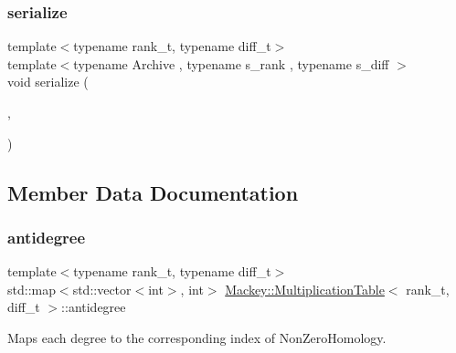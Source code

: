\subsubsection{\texorpdfstring{serialize}{serialize}}
{\footnotesize\ttfamily template$<$typename rank\+\_\+t, typename diff\+\_\+t$>$ \\
template$<$typename Archive , typename s\+\_\+rank , typename s\+\_\+diff $>$ \\
void serialize (\begin{DoxyParamCaption}\item[{Archive \&}]{,  }\item[{\hyperlink{classMackey_1_1MultiplicationTable}{Multiplication\+Table}$<$ s\+\_\+rank, s\+\_\+diff $>$ \&}]{ }\end{DoxyParamCaption})\hspace{0.3cm}{\ttfamily [friend]}}



\subsection{Member Data Documentation}
\mbox{\label{classMackey_1_1MultiplicationTable_ac5749155e5531a3c728d8227caed63eb}} 
\subsubsection{\texorpdfstring{antidegree}{antidegree}}
{\footnotesize\ttfamily template$<$typename rank\+\_\+t, typename diff\+\_\+t$>$ \\
std\+::map$<$std\+::vector$<$int$>$, int$>$ \hyperlink{classMackey_1_1MultiplicationTable}{Mackey\+::\+Multiplication\+Table}$<$ rank\+\_\+t, diff\+\_\+t $>$\+::antidegree\hspace{0.3cm}{\ttfamily [protected]}}



Maps each degree to the corresponding index of Non\+Zero\+Homology. 

\mbox{\label{classMackey_1_1MultiplicationTable_af6896ea01c087e71533de423d7cf65ac}} 
